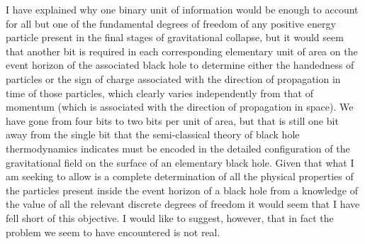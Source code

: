 \documentclass[notitlepage,12pt]{report}
\begin{document}
I have explained why one binary unit of information would be enough to account for all but one of the fundamental degrees of freedom of any positive energy particle present in the final stages of gravitational collapse, but it would seem that another bit is required in each corresponding elementary unit of area on the event horizon of the associated black hole to determine either the handedness of particles or the sign of charge associated with the direction of propagation in time of those particles, which clearly varies independently from that of momentum (which is associated with the direction of propagation in space). We have gone from four bits to two bits per unit of area, but that is still one bit away from the single bit that the semi-classical theory of black hole thermodynamics indicates must be encoded in the detailed configuration of the gravitational field on the surface of an elementary black hole. Given that what I am seeking to allow is a complete determination of all the physical properties of the particles present inside the event horizon of a black hole from a knowledge of the value of all the relevant discrete degrees of freedom it would seem that I have fell short of this objective. I would like to suggest, however, that in fact the problem we seem to have encountered is not real.
\end{document}
